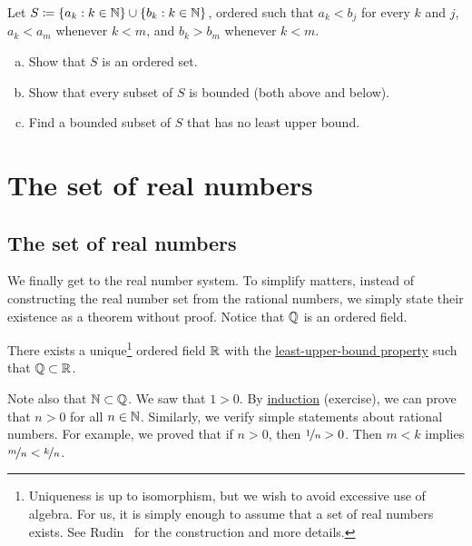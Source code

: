 \begin{exercise}
Let $S \coloneqq \{ a_k : k \in {\mathbb{N}} \} \cup \{ b_k : k \in {\mathbb{N}} \}$, ordered such that
$a_k < b_j$ for every $k$ and $j$,
$a_k < a_m$ whenever $k < m$,
and $b_k > b_m$ whenever $k < m$.
\begin{enumerate}[a)]
\item
Show that $S$ is an ordered set.
\item
Show that every subset of $S$ is bounded (both above and below).
\item
Find a bounded subset of $S$ that has no least upper bound.
\end{enumerate}
\end{exercise}


\sectionnewpage
\section{The set of real numbers} \label{sec:setofreals}



\subsection{The set of real numbers}

We finally get to the real number system.  To simplify matters, instead of constructing the
real number set from the rational numbers, we simply state their existence
as a theorem without proof.  Notice that ${\mathbb{Q}}$ is an ordered
field.

\begin{thm}
There exists a unique\footnote{Uniqueness is up to isomorphism, but we wish
to avoid excessive use of algebra.  For us, it is simply enough to assume
that a set of real numbers exists.  See Rudin~\cite{Rudin:baby} for the
construction and more details.}
ordered field ${\mathbb{R}}$ with the \hyperref[defn:lub]{least-upper-bound property}
such that ${\mathbb{Q}} \subset {\mathbb{R}}$.
\end{thm}

Note also that ${\mathbb{N}} \subset {\mathbb{Q}}$.  We saw that $1 > 0$.
By \hyperref[induction:thm]{induction} (exercise),
we can prove that $n > 0$ for all $n \in {\mathbb{N}}$.
Similarly, we verify simple statements about rational numbers.
For example, we proved that if $n > 0$, then $\nicefrac{1}{n} > 0$.
Then $m < k$ implies $\nicefrac{m}{n} < \nicefrac{k}{n}$.

